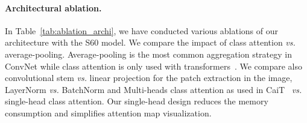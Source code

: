 \paragraph{Architectural ablation.} 
In Table~\ref{tab:ablation_archi}, we have conducted various ablations of our architecture with the S60 model.
We compare the impact of class attention \textit{vs.} average-pooling. Average-pooling is the most common aggregation strategy in ConvNet while class attention is only used with transformers~\cite{touvron2021going}. 
We compare also convolutional stem \textit{vs.} linear projection for the patch extraction in the image, 
LayerNorm \textit{vs.} BatchNorm and 
Multi-heads class attention as used in CaiT~\cite{touvron2021going} \textit{vs.} single-head class attention. Our single-head design reduces the memory consumption and simplifies attention map visualization.



%


\begin{table}[t]
%
\caption{Ablation of our model: we modify each time a single architectural characteristic in our \ournet model S60, and measure how it affects the classification performance on ImageNet1k. Batch-normalization improves the performance a bit. The convolutional stem is key for best performance, and the class-attention brings a slight improvement in addition to enabling attention-based visualisation properties. 
\label{tab:ablation_archi}}
\vspace{-0.5ex}
\centering
{}
\end{table}


